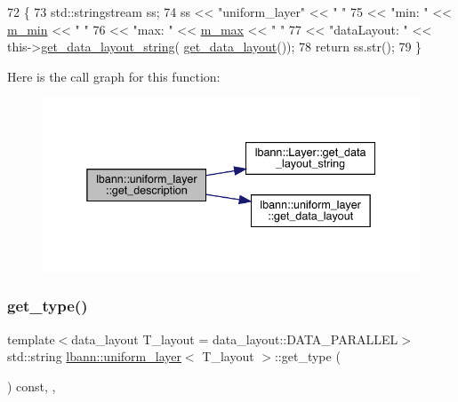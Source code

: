 \begin{DoxyCode}
72                                              \{
73     std::stringstream ss;
74     ss << \textcolor{stringliteral}{"uniform\_layer"} << \textcolor{stringliteral}{"  "}
75        << \textcolor{stringliteral}{"min: "} << \hyperlink{classlbann_1_1uniform__layer_ad2da58c380cf2803da709dd936c19aa1}{m\_min} << \textcolor{stringliteral}{" "}
76        << \textcolor{stringliteral}{"max: "} << \hyperlink{classlbann_1_1uniform__layer_a45004689408c17baf76399f64489c8d4}{m\_max} << \textcolor{stringliteral}{" "}
77        << \textcolor{stringliteral}{"dataLayout: "} << this->\hyperlink{classlbann_1_1Layer_ae3f4a5602df821f4221614b1e3782dc1}{get\_data\_layout\_string}(
      \hyperlink{classlbann_1_1uniform__layer_adacae6beb724aa10b7f625b1418e9015}{get\_data\_layout}());
78      \textcolor{keywordflow}{return} ss.str();
79   \}
\end{DoxyCode}
Here is the call graph for this function\+:\nopagebreak
\begin{figure}[H]
\begin{center}
\leavevmode
\includegraphics[width=338pt]{classlbann_1_1uniform__layer_a41b8f6ed59de66dda1f95a6b4ee4762f_cgraph}
\end{center}
\end{figure}
\mbox{\label{classlbann_1_1uniform__layer_aeae476799ac7ed20ba21f39841352e47}} 
\subsubsection{\texorpdfstring{get\+\_\+type()}{get\_type()}}
{\footnotesize\ttfamily template$<$data\+\_\+layout T\+\_\+layout = data\+\_\+layout\+::\+D\+A\+T\+A\+\_\+\+P\+A\+R\+A\+L\+L\+EL$>$ \\
std\+::string \hyperlink{classlbann_1_1uniform__layer}{lbann\+::uniform\+\_\+layer}$<$ T\+\_\+layout $>$\+::get\+\_\+type (\begin{DoxyParamCaption}{ }\end{DoxyParamCaption}) const\hspace{0.3cm}{\ttfamily [inline]}, {\ttfamily [override]}, {\ttfamily [virtual]}}

